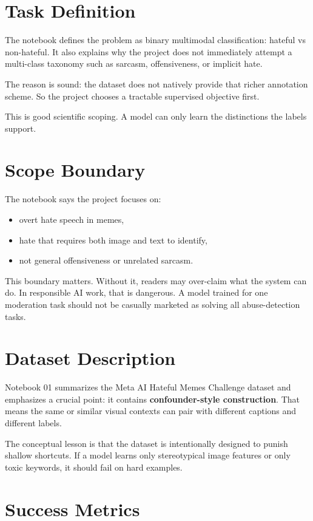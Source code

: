\documentclass[11pt,a4paper]{report}
\begin{document}
\section{Task Definition}

The notebook defines the problem as binary multimodal classification: hateful vs non-hateful. It also explains why the project does not immediately attempt a multi-class taxonomy such as sarcasm, offensiveness, or implicit hate.

The reason is sound: the dataset does not natively provide that richer annotation scheme. So the project chooses a tractable supervised objective first.

This is good scientific scoping. A model can only learn the distinctions the labels support.

\section{Scope Boundary}

The notebook says the project focuses on:

\begin{itemize}
\item overt hate speech in memes,
\item hate that requires both image and text to identify,
\item not general offensiveness or unrelated sarcasm.
\end{itemize}

This boundary matters. Without it, readers may over-claim what the system can do. In responsible AI work, that is dangerous. A model trained for one moderation task should not be casually marketed as solving all abuse-detection tasks.

\section{Dataset Description}

Notebook 01 summarizes the Meta AI Hateful Memes Challenge dataset and emphasizes a crucial point: it contains \textbf{confounder-style construction}. That means the same or similar visual contexts can pair with different captions and different labels.

The conceptual lesson is that the dataset is intentionally designed to punish shallow shortcuts. If a model learns only stereotypical image features or only toxic keywords, it should fail on hard examples.

\section{Success Metrics}
\end{document}
